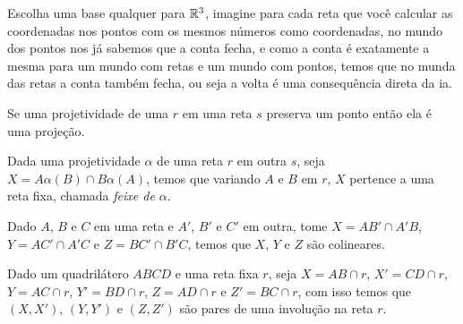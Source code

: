 Escolha uma base qualquer para $\mathbb{R}^3$, imagine para cada reta que você calcular as coordenadas nos pontos com os mesmos números como coordenadas, no mundo dos pontos nos já sabemos que a conta fecha, e como a conta é exatamente a mesma para um mundo com retas e um mundo com pontos, temos que no munda das retas a conta também fecha, ou seja a volta é uma consequência direta da ia.
\newpage

\begin{lem}
Se uma projetividade de uma $r$ em uma reta $s$ preserva um ponto então ela é uma projeção.
\end{lem}

\begin{thm}
Dada uma projetividade $\alpha$ de uma reta $r$ em outra $s$, seja $X = A\alpha(B) \cap B\alpha(A)$, temos que variando $A$ e $B$ em $r$, $X$ pertence a uma reta fixa, chamada \emph{feixe de $\alpha$}.
\end{thm}

\begin{cor}
Dado $A$, $B$ e $C$ em uma reta e $A'$, $B'$ e $C'$ em outra, tome $X = AB' \cap A'B$, $Y = AC'\cap A'C$ e $Z = BC' \cap B'C$, temos que $X$, $Y$ e $Z$ são colineares.
\end{cor}


\begin{thm}
Dado um quadrilátero $ABCD$ e uma reta fixa $r$, seja $X = AB \cap r$, $X' = CD \cap r$, $Y = AC \cap r$, $Y' = BD \cap r$, $Z = AD \cap r$ e $Z' = BC \cap r$, com isso temos que $(X,X')$, $(Y,Y')$ e $(Z,Z')$ são pares de uma involução na reta $r$.
    
\end{thm}